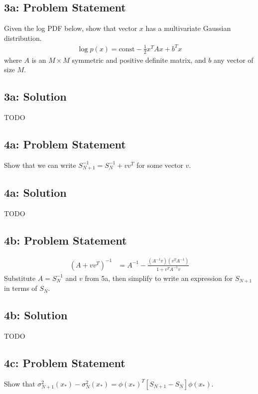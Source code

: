 \documentclass[12pt]{article}
\newcommand{\officialdirections}[1]{{\color{blue} #1}}
\begin{document}
\newpage
\officialdirections{
\subsection*{3a: Problem Statement}
Given the log PDF below, show that vector $x$ has a multivariate Gaussian distribution.
\begin{align}
\log p(x) = \text{const} - \frac{1}{2} x^T A x + b^T x
\end{align}
where $A$ is an $M \times M$ symmetric and positive definite matrix, and $b$ any vector of size $M$.
}


\subsection{3a: Solution}
TODO




\newpage
\officialdirections{
\subsection*{4a: Problem Statement}
Show that we can write $S_{N+1}^{-1} = S_N^{-1} + vv^T$ for some vector $v$.
}

\subsection{4a: Solution}
TODO

\newpage
\officialdirections{
\subsection*{4b: Problem Statement}
\begin{align}
(A + vv^T)^{-1} &= A^{-1} - \frac{ (A^{-1}v)(v^T A^{-1})}{ 1 + v^T A^{-1} v}
\end{align}
Substitute $A = S_N^{-1}$ and $v$ from 5a, then simplify to write an expression for $S_{N+1}$ in terms of $S_{N}$.
}

\subsection{4b: Solution}
TODO

\newpage
\officialdirections{
\subsection*{4c: Problem Statement}
Show that $\sigma^2_{N+1}(x_*) - \sigma^2_{N}(x_*) = \phi(x_*)^T \left[ S_{N+1} - S_{N} \right] \phi(x_*)$.
}
\end{document}
